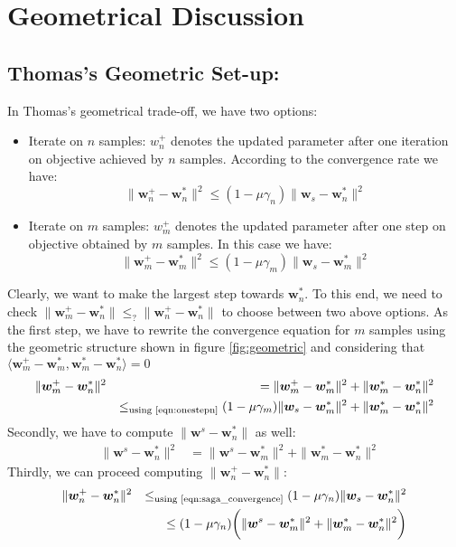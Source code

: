 \documentclass[11pt, a4paper, reqno, twoside]{scrartcl}
\theoremstyle{style}
\newcommand{\wv}{\bm{w}}
\newcommand{\0}{\mathbf{0}} %
\begin{document}
\section{Geometrical Discussion}
\subsection{Thomas's Geometric Set-up:}
In Thomas's geometrical trade-off, we have two options:
\begin{itemize}
  \item Iterate on $n$ samples: $w_n^+$ denotes the updated parameter after one
  iteration on objective achieved by $n$ samples. According to the
  convergence rate we have:
  \begin{equation} \label{eqn:onestepn}
  	\|\wv_n^+ - \wv_n^*\|^2 \leq (1-\mu \gamma_n) \|\wv_s - \wv_n^* \|^2 
  \end{equation}
  \item Iterate on $m$ samples: $w_m^+$ denotes the updated parameter after one
  step on objective obtained by $m$ samples. In this case we have: 
  \begin{equation}
  	\|\wv_m^+ - \wv_m^*\|^2 \leq (1-\mu \gamma_m) \|\wv_s - \wv_m^* \|^2
  	\nonumber
  \end{equation}
\end{itemize}
Clearly, we want to make the largest step towards $\wv_n^*$. To this end, we
need to check $\|\wv_m^+ - \wv_n^*\| \leq_{?} \|\wv_n^+ - \wv_n^*\|$ to choose
between two above options.
As the first step, we have to rewrite the convergence equation for $m$ samples
using the geometric structure shown in figure \ref{fig:geometric} and considering that
$\langle\wv_m^+-\wv_m^*,\wv_m^*-\wv_n^*\rangle = 0$
\begin{eqnarray}
  & \|\wv_m^+ - \wv_n^*\|^2 & = \|\wv_m^+ - \wv_m^*\|^2+\|\wv_m^* -
  \wv_n^*\|^2 \nonumber \\ 
  & & \leq_{\text{using \ref{eqn:onestepn}}} (1-\mu \gamma_m) \|\wv_s - \wv_m^*
  \|^2 +\|\wv_m^* - \wv_n^*\|^2 \nonumber
\end{eqnarray}
Secondly, we have to compute $\|\wv^s - \wv_n^*\|$ as well:
\begin{eqnarray}
& \|\wv^s - \wv_n^*\|^2 & = \|\wv^s -
\wv_m^*\|^2+\|\wv_m^* - \wv_n^*\|^2 \nonumber
\end{eqnarray} 
Thirdly, we can proceed computing $\|\wv_n^+ - \wv_n^*\|$: 
\begin{eqnarray}
	& \|\wv_n^+ - \wv_n^*\|^2 & \leq_{\text{using \ref{eqn:saga_convergence}}}
	(1-\mu \gamma_n) \|\wv_s - \wv_n^*\|^2  \nonumber\\ 
	& & \leq (1-\mu \gamma_n)\bigg(\|\wv^s -
\wv_m^*\|^2+\|\wv_m^* - \wv_n^*\|^2\bigg) \nonumber
\end{eqnarray}
\end{document}
